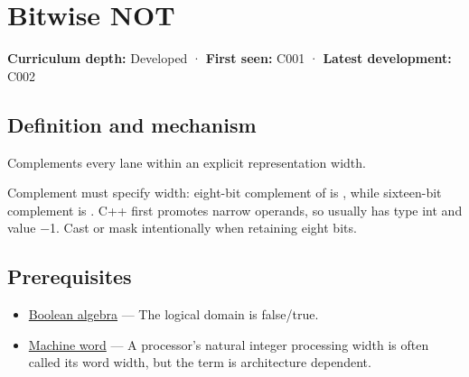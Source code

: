 \hypertarget{appendix-8f38927cfc54}{}\label{referencestart:appendix-8f38927cfc54}
\section{Bitwise NOT}\label{appendix-8f38927cfc54-bitwise-not}

\hypertarget{appendix-8f38927cfc54-bitwise-not}{}

\textbf{Curriculum depth:} Developed · \textbf{First seen:} C001 · \textbf{Latest development:} C002

\begin{allmightroledefinition}

\subsection{Definition and mechanism}\label{appendix-8f38927cfc54-definition-and-mechanism}

\hypertarget{appendix-8f38927cfc54-definition-and-mechanism}{}

Complements every lane within an explicit representation width.

\end{allmightroledefinition}

Complement must specify width: eight-bit complement of  is , while sixteen-bit complement is . C++ first promotes narrow operands, so  usually has type int and value −1. Cast or mask intentionally when retaining eight bits.

\subsection{Prerequisites}\label{appendix-8f38927cfc54-prerequisites}

\hypertarget{appendix-8f38927cfc54-prerequisites}{}

\begin{itemize}
\tightlist
\item
  \hyperref[appendix-24475e1596a8]{Boolean algebra} --- The logical domain is false/true.
\item
  \hyperref[appendix-d67a19507dc5]{Machine word} --- A processor's natural integer processing width is often called its word width, but the term is architecture dependent.
\end{itemize}

